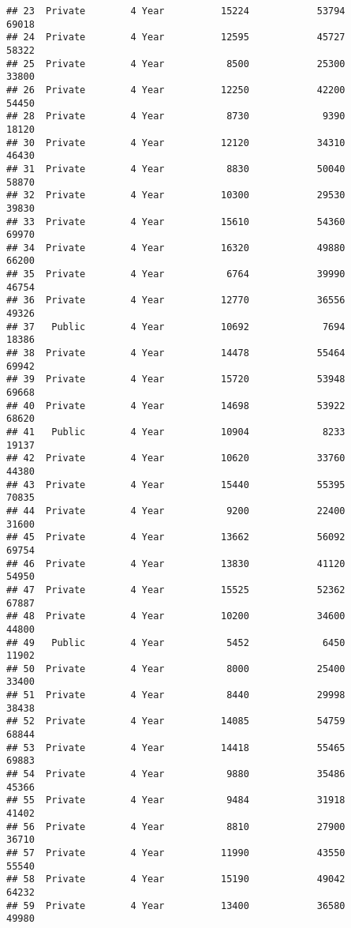 \documentclass[
]{article}
\begin{document}
\begin{verbatim}
## 23  Private        4 Year          15224            53794          69018
## 24  Private        4 Year          12595            45727          58322
## 25  Private        4 Year           8500            25300          33800
## 26  Private        4 Year          12250            42200          54450
## 28  Private        4 Year           8730             9390          18120
## 30  Private        4 Year          12120            34310          46430
## 31  Private        4 Year           8830            50040          58870
## 32  Private        4 Year          10300            29530          39830
## 33  Private        4 Year          15610            54360          69970
## 34  Private        4 Year          16320            49880          66200
## 35  Private        4 Year           6764            39990          46754
## 36  Private        4 Year          12770            36556          49326
## 37   Public        4 Year          10692             7694          18386
## 38  Private        4 Year          14478            55464          69942
## 39  Private        4 Year          15720            53948          69668
## 40  Private        4 Year          14698            53922          68620
## 41   Public        4 Year          10904             8233          19137
## 42  Private        4 Year          10620            33760          44380
## 43  Private        4 Year          15440            55395          70835
## 44  Private        4 Year           9200            22400          31600
## 45  Private        4 Year          13662            56092          69754
## 46  Private        4 Year          13830            41120          54950
## 47  Private        4 Year          15525            52362          67887
## 48  Private        4 Year          10200            34600          44800
## 49   Public        4 Year           5452             6450          11902
## 50  Private        4 Year           8000            25400          33400
## 51  Private        4 Year           8440            29998          38438
## 52  Private        4 Year          14085            54759          68844
## 53  Private        4 Year          14418            55465          69883
## 54  Private        4 Year           9880            35486          45366
## 55  Private        4 Year           9484            31918          41402
## 56  Private        4 Year           8810            27900          36710
## 57  Private        4 Year          11990            43550          55540
## 58  Private        4 Year          15190            49042          64232
## 59  Private        4 Year          13400            36580          49980

\end{verbatim}
\end{document}
